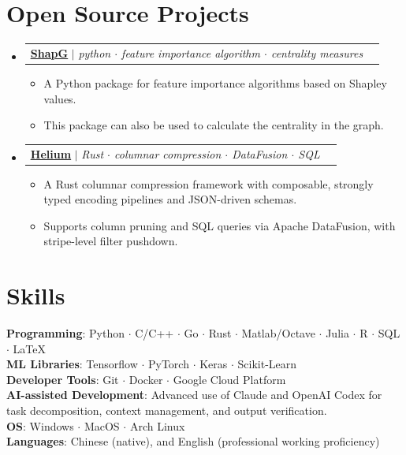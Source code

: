 \documentclass[letterpaper,10pt]{article}
\makeatletter
\newcommand{\link}[2]{\href{#1}{\color{blue}\underline{#2}}}
\newcommand{\resumeItem}[1]{
  \item\small{
    {#1 \vspace{-2pt}}
  }
}
\newcommand{\resumeProjectHeading}[2]{
  \item
  \begin{tabular*}{0.97\textwidth}{l@{\extracolsep{\fill}}r}
    \small#1 & #2 \\
  \end{tabular*}\vspace{-7pt}
}
\newenvironment{resumeSubHeadingList}{\begin{itemize}[leftmargin=0.15in, label={}]}{\end{itemize}}
\newenvironment{resumeItemList}{\begin{itemize}}{\end{itemize}}
\makeatother
\begin{document}
\section{Open Source Projects}
\begin{resumeSubHeadingList}

  \resumeProjectHeading{
    \link{https://github.com/vectorsss/shapG}{\textbf{ShapG}} $|$
    \emph{python $\cdot$ feature importance algorithm $\cdot$ centrality
          measures}}{}
  \begin{resumeItemList}
    \resumeItem{A Python package for feature importance algorithms based on
                Shapley values.}
    \resumeItem{This package can also be used to calculate the centrality in
                the graph.}
  \end{resumeItemList}
  \resumeProjectHeading{
    \link{https://github.com/vectorsss/helium-columnar}{\textbf{Helium}} $|$
    \emph{Rust $\cdot$ columnar compression $\cdot$ DataFusion $\cdot$ SQL}}{}
  \begin{resumeItemList}
    \resumeItem{A Rust columnar compression framework with composable, strongly
                typed encoding pipelines and JSON-driven schemas.}
    \resumeItem{Supports column pruning and SQL queries via Apache DataFusion,
                with stripe-level filter pushdown.}
  \end{resumeItemList}
\end{resumeSubHeadingList}

\section{Skills}
\begin{itemize}[leftmargin=0.15in, label={}]
  \small{\item{
        \textbf{Programming}{: Python $\cdot$ C/C++ $\cdot$ Go $\cdot$ Rust $\cdot$ Matlab/Octave $\cdot$ Julia $\cdot$ R $\cdot$ SQL $\cdot$ \LaTeX} \\
        \textbf{ML Libraries}{: Tensorflow $\cdot$  PyTorch $\cdot$ Keras $\cdot$  Scikit-Learn} \\
        \textbf{Developer Tools}{: Git $\cdot$ Docker $\cdot$  Google Cloud Platform} \\
        \textbf{AI-assisted Development}{: Advanced use of Claude and OpenAI Codex for task decomposition, context management, and output verification.} \\
        \textbf{OS}{: Windows $\cdot$ MacOS $\cdot$ Arch Linux} \\
        \textbf{Languages}{: Chinese (native), and English (professional working proficiency)}
        }}
\end{itemize}
\end{document}
